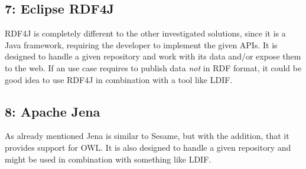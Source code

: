 \subsection*{7: Eclipse RDF4J}
RDF4J is completely different to the other investigated solutions, since it is a Java framework, requiring the developer to implement the given APIs. It is designed to handle a given repository and work with its data and/or expose them to the web. If an use case requires to publish data \emph{not} in RDF format, it could be good idea to use RDF4J in combination with a tool like LDIF.

\subsection*{8: Apache Jena}
As already mentioned Jena is similar to Sesame, but with the addition, that it provides support for OWL. It is also designed to handle a given repository and might be used in combination with something like LDIF.